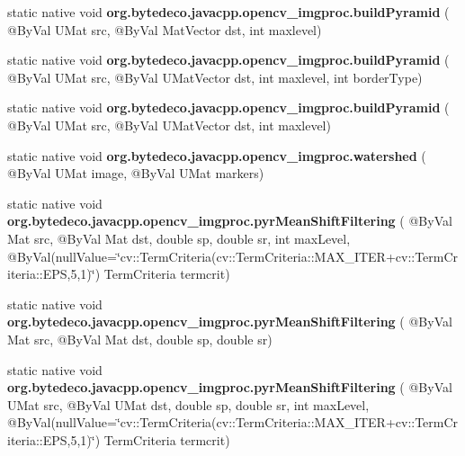 \begin{DoxyCompactItemize}
\item 
\mbox{\label{group__imgproc__filter_ga0d03e58e45765e1a2c32da446782d85f}} 
static native void {\bfseries org.\+bytedeco.\+javacpp.\+opencv\+\_\+imgproc.\+build\+Pyramid} ( @By\+Val U\+Mat src, @By\+Val Mat\+Vector dst, int maxlevel)
\item 
\mbox{\label{group__imgproc__filter_gaec3a86fcf530d0110b9dcde9e37c73e3}} 
static native void {\bfseries org.\+bytedeco.\+javacpp.\+opencv\+\_\+imgproc.\+build\+Pyramid} ( @By\+Val U\+Mat src, @By\+Val U\+Mat\+Vector dst, int maxlevel, int border\+Type)
\item 
\mbox{\label{group__imgproc__filter_gaa018e0328589d5ad75d8cd2cd1a85e8d}} 
static native void {\bfseries org.\+bytedeco.\+javacpp.\+opencv\+\_\+imgproc.\+build\+Pyramid} ( @By\+Val U\+Mat src, @By\+Val U\+Mat\+Vector dst, int maxlevel)
\item 
\mbox{\label{group__imgproc__filter_ga74042529e3a3ecd92e161e5b62548ed5}} 
static native void {\bfseries org.\+bytedeco.\+javacpp.\+opencv\+\_\+imgproc.\+watershed} ( @By\+Val U\+Mat image, @By\+Val U\+Mat markers)
\item 
\mbox{\label{group__imgproc__filter_gac432ef4564feb8b2e1a2deac4db12913}} 
static native void {\bfseries org.\+bytedeco.\+javacpp.\+opencv\+\_\+imgproc.\+pyr\+Mean\+Shift\+Filtering} ( @By\+Val Mat src, @By\+Val Mat dst, double sp, double sr, int max\+Level, @By\+Val(null\+Value=\char`\"{}cv\+::\+Term\+Criteria(cv\+::\+Term\+Criteria\+::\+M\+A\+X\+\_\+\+I\+T\+ER+cv\+::\+Term\+Criteria\+::\+E\+PS,5,1)\char`\"{}) Term\+Criteria termcrit)
\item 
\mbox{\label{group__imgproc__filter_gade4d4ba80ee1a0a3ac366425edf6b911}} 
static native void {\bfseries org.\+bytedeco.\+javacpp.\+opencv\+\_\+imgproc.\+pyr\+Mean\+Shift\+Filtering} ( @By\+Val Mat src, @By\+Val Mat dst, double sp, double sr)
\item 
\mbox{\label{group__imgproc__filter_ga154238333e747daf891663cdb33d1a33}} 
static native void {\bfseries org.\+bytedeco.\+javacpp.\+opencv\+\_\+imgproc.\+pyr\+Mean\+Shift\+Filtering} ( @By\+Val U\+Mat src, @By\+Val U\+Mat dst, double sp, double sr, int max\+Level, @By\+Val(null\+Value=\char`\"{}cv\+::\+Term\+Criteria(cv\+::\+Term\+Criteria\+::\+M\+A\+X\+\_\+\+I\+T\+ER+cv\+::\+Term\+Criteria\+::\+E\+PS,5,1)\char`\"{}) Term\+Criteria termcrit)

\end{DoxyCompactItemize}
